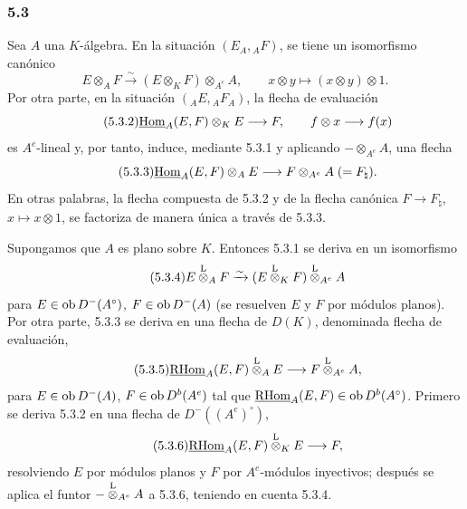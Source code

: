 \subsubsection*{5.3}

Sea $A$ una $K$-álgebra. En la situación $(E_A,{}_AF)$, se tiene un isomorfismo canónico
\begin{equation}\tag{5.3.1}
E\otimes_AF\xrightarrow{\sim}(E\otimes_KF)\otimes_{A^e}A,
\qquad x\otimes y\longmapsto (x\otimes y)\otimes 1.
\end{equation}
Por otra parte, en la situación $({}_AE,{}_AF_A)$, la flecha de evaluación
\begin{equation}\tag{5.3.2}
\underline{\operatorname{Hom}}_A(E,F)\otimes_KE\longrightarrow F,
\qquad f\otimes x\longrightarrow f(x)
\end{equation}
es $A^e$-lineal y, por tanto, induce, mediante 5.3.1 y aplicando $-\otimes_{A^e}A$, una flecha
\begin{equation}\tag{5.3.3}
\underline{\operatorname{Hom}}_A(E,F)\otimes_AE\longrightarrow F\otimes_{A^e}A\;(=F_\natural).
\end{equation}
En otras palabras, la flecha compuesta de 5.3.2 y de la flecha canónica $F\to F_\natural$, $x\mapsto x\otimes 1$, se factoriza de manera única a través de 5.3.3.

Supongamos que $A$ es plano sobre $K$. Entonces 5.3.1 se deriva en un isomorfismo
\begin{equation}\tag{5.3.4}
E\overset{\mathrm L}{\otimes}_AF\xrightarrow{\sim}(E\overset{\mathrm L}{\otimes}_KF)\overset{\mathrm L}{\otimes}_{A^e}A
\end{equation}
para $E\in\operatorname{ob} D^-(A^\circ)$, $F\in\operatorname{ob} D^-(A)$ (se resuelven $E$ y $F$ por módulos planos). Por otra parte, 5.3.3 se deriva en una flecha de $D(K)$, denominada flecha de evaluación,
\begin{equation}\tag{5.3.5}
\underline{\mathrm{RHom}}_A(E,F)\overset{\mathrm L}{\otimes}_AE\longrightarrow F\overset{\mathrm L}{\otimes}_{A^e}A,
\end{equation}
para $E\in\operatorname{ob} D^-(A)$, $F\in\operatorname{ob} D^b(A^e)$ tal que $\underline{\mathrm{RHom}}_A(E,F)\in\operatorname{ob} D^b(A^\circ)$. Primero se deriva 5.3.2 en una flecha de $D^-((A^e)^\circ)$,
\begin{equation}\tag{5.3.6}
\underline{\mathrm{RHom}}_A(E,F)\overset{\mathrm L}{\otimes}_KE\longrightarrow F,
\end{equation}
resolviendo $E$ por módulos planos y $F$ por $A^e$-módulos inyectivos; después se aplica el funtor $-\overset{\mathrm L}{\otimes}_{A^e}A$ a 5.3.6, teniendo en cuenta 5.3.4.
